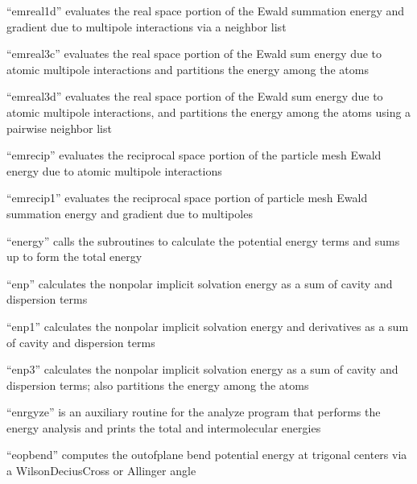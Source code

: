 \documentclass[letterpaper,11pt,english]{sphinxmanual}
\begin{document}

“emreal1d” evaluates the real space portion of the Ewald
summation energy and gradient due to multipole interactions
via a neighbor list


“emreal3c” evaluates the real space portion of the Ewald sum
energy due to atomic multipole interactions and partitions
the energy among the atoms


“emreal3d” evaluates the real space portion of the Ewald sum
energy due to atomic multipole interactions, and partitions
the energy among the atoms using a pairwise neighbor list


“emrecip” evaluates the reciprocal space portion of the particle
mesh Ewald energy due to atomic multipole interactions


“emrecip1” evaluates the reciprocal space portion of particle
mesh Ewald summation energy and gradient due to multipoles


“energy” calls the subroutines to calculate the potential
energy terms and sums up to form the total energy


“enp” calculates the nonpolar implicit solvation energy
as a sum of cavity and dispersion terms


“enp1” calculates the nonpolar implicit solvation energy
and derivatives as a sum of cavity and dispersion terms


“enp3” calculates the nonpolar implicit solvation energy as
a sum of cavity and dispersion terms; also partitions the
energy among the atoms


“enrgyze” is an auxiliary routine for the analyze program
that performs the energy analysis and prints the total and
intermolecular energies


“eopbend” computes the out\sphinxhyphen{}of\sphinxhyphen{}plane bend potential energy at
trigonal centers via a Wilson\sphinxhyphen{}Decius\sphinxhyphen{}Cross or Allinger angle
\end{document}
